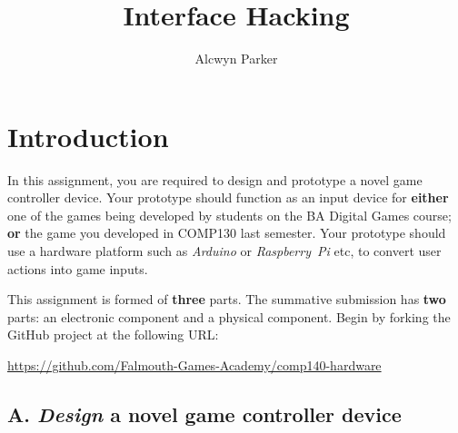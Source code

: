 \documentclass{../fal_assignment}
\title{Interface Hacking}
\author{Alcwyn Parker}
\begin{document}
\maketitle
%    
\section*{Introduction}

In this assignment, you are required to design and prototype a novel game controller device.
Your prototype should function as an input device for \textbf{either}
one of the games being developed by students on the BA Digital Games course; \textbf{or}
the game you developed in COMP130 last semester.
Your prototype should use a hardware platform such as \emph{Arduino} or \emph{Raspberry~Pi} etc,
to convert user actions into game inputs.


This assignment is formed of \textbf{three} parts.
The summative submission has \textbf{two} parts: an electronic component and a physical component.
Begin by forking the GitHub project at the following URL:
\begin{center}
\url{https://github.com/Falmouth-Games-Academy/comp140-hardware}
\end{center}

\subsection*{A. \emph{Design} a novel game controller device}
\end{document}
